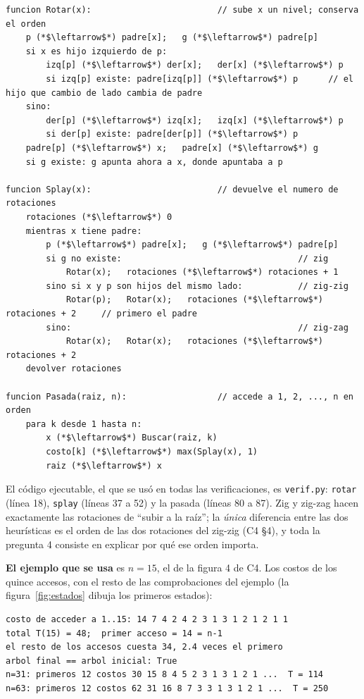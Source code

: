 \documentclass[11pt]{article}
\begin{document}
\begin{lstlisting}[style=pseudo]
funcion Rotar(x):                         // sube x un nivel; conserva el orden
    p (*$\leftarrow$*) padre[x];   g (*$\leftarrow$*) padre[p]
    si x es hijo izquierdo de p:
        izq[p] (*$\leftarrow$*) der[x];   der[x] (*$\leftarrow$*) p
        si izq[p] existe: padre[izq[p]] (*$\leftarrow$*) p      // el hijo que cambio de lado cambia de padre
    sino:
        der[p] (*$\leftarrow$*) izq[x];   izq[x] (*$\leftarrow$*) p
        si der[p] existe: padre[der[p]] (*$\leftarrow$*) p
    padre[p] (*$\leftarrow$*) x;   padre[x] (*$\leftarrow$*) g
    si g existe: g apunta ahora a x, donde apuntaba a p

funcion Splay(x):                         // devuelve el numero de rotaciones
    rotaciones (*$\leftarrow$*) 0
    mientras x tiene padre:
        p (*$\leftarrow$*) padre[x];   g (*$\leftarrow$*) padre[p]
        si g no existe:                                   // zig
            Rotar(x);   rotaciones (*$\leftarrow$*) rotaciones + 1
        sino si x y p son hijos del mismo lado:           // zig-zig
            Rotar(p);   Rotar(x);   rotaciones (*$\leftarrow$*) rotaciones + 2     // primero el padre
        sino:                                             // zig-zag
            Rotar(x);   Rotar(x);   rotaciones (*$\leftarrow$*) rotaciones + 2
    devolver rotaciones

funcion Pasada(raiz, n):                  // accede a 1, 2, ..., n en orden
    para k desde 1 hasta n:
        x (*$\leftarrow$*) Buscar(raiz, k)
        costo[k] (*$\leftarrow$*) max(Splay(x), 1)
        raiz (*$\leftarrow$*) x
\end{lstlisting}
El código ejecutable, el que se usó en todas las verificaciones, es \texttt{verif.py}: \texttt{rotar} (línea
18), \texttt{splay} (líneas 37 a 52) y la pasada (líneas 80 a
87). Zig y zig-zag hacen exactamente las rotaciones de ``subir a la raíz''; la \emph{única} diferencia
entre las dos heurísticas es el orden de las dos rotaciones del zig-zig (C4 §4), y toda la pregunta 4 consiste en
explicar por qué ese orden importa.

\textbf{El ejemplo que se usa} es $n=15$, el de la figura 4 de C4. Los costos de los quince accesos, con el
resto de las comprobaciones del ejemplo (la figura~\ref{fig:estados} dibuja los primeros estados):
\begin{lstlisting}[style=salida,basicstyle=\ttfamily\footnotesize\color{black},columns=fixed]
costo de acceder a 1..15: 14 7 4 2 4 2 3 1 3 1 2 1 2 1 1
total T(15) = 48;  primer acceso = 14 = n-1
el resto de los accesos cuesta 34, 2.4 veces el primero
arbol final == arbol inicial: True
n=31: primeros 12 costos 30 15 8 4 5 2 3 1 3 1 2 1 ...  T = 114
n=63: primeros 12 costos 62 31 16 8 7 3 3 1 3 1 2 1 ...  T = 250
\end{lstlisting}
\end{document}
